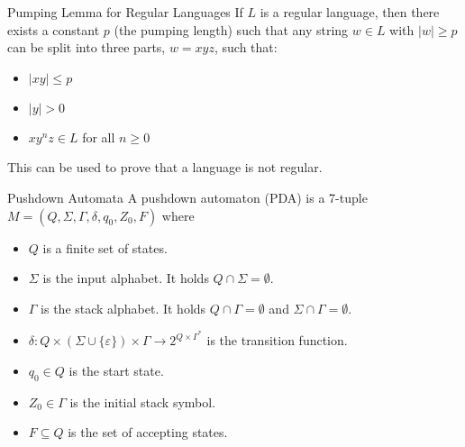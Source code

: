 \documentclass{beamer}
\begin{document}
\begin{frame}{Pumping Lemma for Regular Languages}
    If $L$ is a regular language, then there exists a constant $p$ (the pumping length) such that any string $w\in L$ with $|w|\geq p$ can be split into three parts, $w=xyz$, such that:
    \begin{itemize}
        \item $|xy|\leq p$
        \item $|y|>0$
        \item $xy^n z\in L$ for all $n\geq 0$
    \end{itemize}
    This can be used to prove that a language is not regular.

    \end{frame}

\begin{frame}{Pushdown Automata}
    A pushdown automaton (PDA) is a 7-tuple $M=(Q,\Sigma,\Gamma,\delta,q_0,Z_0,F)$ where
    \begin{itemize}
        \item $Q$ is a finite set of states.
        \item $\Sigma$ is the input alphabet. It holds $Q\cap \Sigma=\emptyset$.
        \item $\Gamma$ is the stack alphabet. It holds $Q\cap \Gamma=\emptyset$ and $\Sigma\cap \Gamma=\emptyset$.
        \item $\delta:Q\times (\Sigma\cup\{\varepsilon\})\times \Gamma\to 2^{Q\times \Gamma^*}$ is the transition function.
        \item $q_0\in Q$ is the start state.
        \item $Z_0\in \Gamma$ is the initial stack symbol.
        \item $F\subseteq Q$ is the set of accepting states.
    \end{itemize}
    \end{frame}
\end{document}
